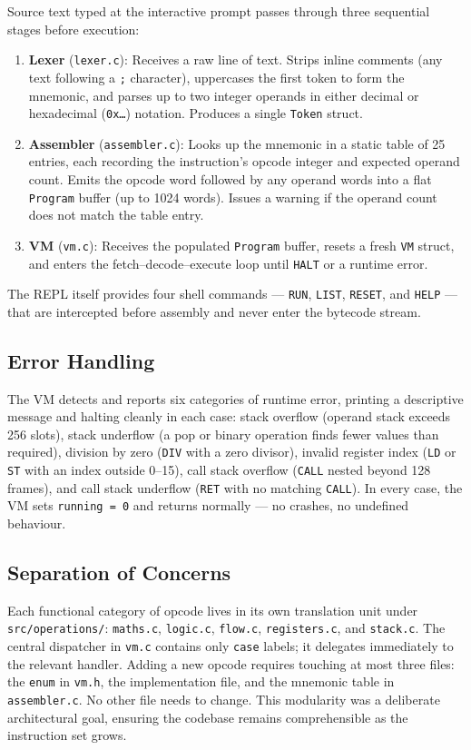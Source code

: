 Source text typed at the interactive prompt passes through three sequential stages before execution:

\begin{enumerate}
    \item \textbf{Lexer} (\texttt{lexer.c}): Receives a raw line of text. Strips inline comments (any text following a \texttt{;} character), uppercases the first token to form the mnemonic, and parses up to two integer operands in either decimal or hexadecimal (\texttt{0x\ldots}) notation. Produces a single \texttt{Token} struct.
    \item \textbf{Assembler} (\texttt{assembler.c}): Looks up the mnemonic in a static table of 25 entries, each recording the instruction's opcode integer and expected operand count. Emits the opcode word followed by any operand words into a flat \texttt{Program} buffer (up to 1024 words). Issues a warning if the operand count does not match the table entry.
    \item \textbf{VM} (\texttt{vm.c}): Receives the populated \texttt{Program} buffer, resets a fresh \texttt{VM} struct, and enters the fetch–decode–execute loop until \texttt{HALT} or a runtime error.
\end{enumerate}

The REPL itself provides four shell commands — \texttt{RUN}, \texttt{LIST}, \texttt{RESET}, and \texttt{HELP} — that are intercepted before assembly and never enter the bytecode stream.

\subsection*{Error Handling}

The VM detects and reports six categories of runtime error, printing a descriptive message and halting cleanly in each case: stack overflow (operand stack exceeds 256 slots), stack underflow (a pop or binary operation finds fewer values than required), division by zero (\texttt{DIV} with a zero divisor), invalid register index (\texttt{LD} or \texttt{ST} with an index outside 0–15), call stack overflow (\texttt{CALL} nested beyond 128 frames), and call stack underflow (\texttt{RET} with no matching \texttt{CALL}). In every case, the VM sets \texttt{running = 0} and returns normally — no crashes, no undefined behaviour.

\subsection*{Separation of Concerns}

Each functional category of opcode lives in its own translation unit under \texttt{src/operations/}: \texttt{maths.c}, \texttt{logic.c}, \texttt{flow.c}, \texttt{registers.c}, and \texttt{stack.c}. The central dispatcher in \texttt{vm.c} contains only \texttt{case} labels; it delegates immediately to the relevant handler. Adding a new opcode requires touching at most three files: the \texttt{enum} in \texttt{vm.h}, the implementation file, and the mnemonic table in \texttt{assembler.c}. No other file needs to change. This modularity was a deliberate architectural goal, ensuring the codebase remains comprehensible as the instruction set grows.